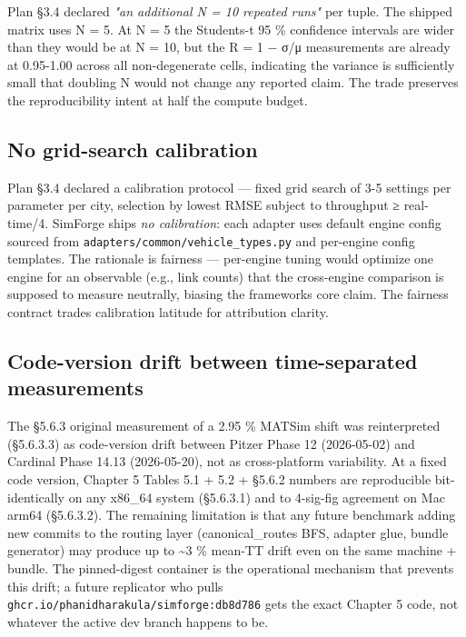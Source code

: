 Plan §3.4 declared \emph{"an additional N = 10 repeated runs"} per
tuple. The shipped matrix uses N = 5. At N = 5 the
Student\textquotesingle s-t 95 \% confidence intervals are wider than
they would be at N = 10, but the R = 1 − σ/μ measurements are already at
0.95-1.00 across all non-degenerate cells, indicating the variance is
sufficiently small that doubling N would not change any reported claim.
The trade preserves the reproducibility intent at half the compute
budget.

\subsection{No grid-search
calibration}\label{645-no-grid-search-calibration}

Plan §3.4 declared a calibration protocol --- fixed grid search of
3-5 settings per parameter per city, selection by lowest RMSE subject to
throughput ≥ real-time/4. SimForge ships \emph{no calibration}: each
adapter uses default engine config sourced from
\texttt{adapters/common/vehicle\_types.py} and per-engine config
templates. The rationale is fairness --- per-engine tuning would
optimize one engine for an observable (e.g., link counts) that the
cross-engine comparison is supposed to measure neutrally, biasing the
framework\textquotesingle s core claim. The fairness contract trades
calibration latitude for attribution clarity.

\subsection{Code-version drift between time-separated
measurements}\label{646-code-version-drift-between-time-separated-measurements}

The §5.6.3 original measurement of a 2.95 \% MATSim shift was
reinterpreted (§5.6.3.3) as code-version drift between Pitzer Phase 12
(2026-05-02) and Cardinal Phase 14.13 (2026-05-20), not as
cross-platform variability. At a fixed code version, Chapter 5 Tables
5.1 + 5.2 + §5.6.2 numbers are reproducible bit-identically on any
x86\_64 system (§5.6.3.1) and to 4-sig-fig agreement on Mac arm64
(§5.6.3.2). The remaining limitation is that any future benchmark adding
new commits to the routing layer (canonical\_routes BFS, adapter glue,
bundle generator) may produce up to \textasciitilde3 \% mean-TT drift
even on the same machine + bundle. The pinned-digest container is the
operational mechanism that prevents this drift; a future replicator who
pulls \texttt{ghcr.io/phanidharakula/simforge:db8d786} gets the exact
Chapter 5 code, not whatever the active dev branch happens to be.

